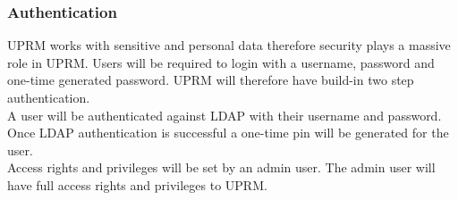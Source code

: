 
\subsubsection{Authentication}
UPRM works with sensitive and personal data therefore security plays a massive role in UPRM.
Users will be required to login with a username, password and one-time generated password. UPRM will therefore have build-in two step authentication. \\

A user will be authenticated against LDAP with their username and password. Once LDAP authentication is successful a one-time pin will be generated for the user.\\

Access rights and privileges will be set by an admin user. The admin user will have full access rights and privileges to UPRM.\\

\centerline{}


